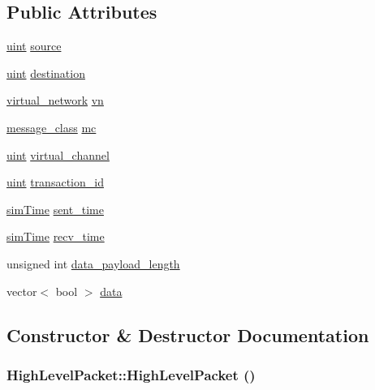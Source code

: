 \subsection*{Public Attributes}
\begin{CompactItemize}
\item 
\hyperlink{outputBuffer_8h_91ad9478d81a7aaf2593e8d9c3d06a14}{uint} \hyperlink{classHighLevelPacket_d09485039d19ea9f0f58697e9fdf6450}{source}
\item 
\hyperlink{outputBuffer_8h_91ad9478d81a7aaf2593e8d9c3d06a14}{uint} \hyperlink{classHighLevelPacket_abe7a75c784f1824211ba194819e0d4e}{destination}
\item 
\hyperlink{highLevelPacket_8h_2f11671ee174f5c324e71f348aef6e96}{virtual\_\-network} \hyperlink{classHighLevelPacket_0e554b43c609ab77758300f332679a29}{vn}
\item 
\hyperlink{highLevelPacket_8h_155eefa40b3e6db305cb151f7bb6bef4}{message\_\-class} \hyperlink{classHighLevelPacket_4bddc51ad584c87c2241b800f6b2f0c9}{mc}
\item 
\hyperlink{outputBuffer_8h_91ad9478d81a7aaf2593e8d9c3d06a14}{uint} \hyperlink{classHighLevelPacket_0e369f54800e9bb403f8277b94cbaa96}{virtual\_\-channel}
\item 
\hyperlink{outputBuffer_8h_91ad9478d81a7aaf2593e8d9c3d06a14}{uint} \hyperlink{classHighLevelPacket_287c21f9e31f882ffe8c8ff353dab087}{transaction\_\-id}
\item 
\hyperlink{genericComponentHeader_8h_d88faca783e7aa496cda721d9029a2e3}{simTime} \hyperlink{classHighLevelPacket_eed2f14fb0b689f35a92c054a831867c}{sent\_\-time}
\item 
\hyperlink{genericComponentHeader_8h_d88faca783e7aa496cda721d9029a2e3}{simTime} \hyperlink{classHighLevelPacket_5de1d4d144aa5e9fdac1a3988384d92f}{recv\_\-time}
\item 
unsigned int \hyperlink{classHighLevelPacket_c7bf05e9b1560991d60ca12fd0d309a3}{data\_\-payload\_\-length}
\item 
vector$<$ bool $>$ \hyperlink{classHighLevelPacket_340b7688df206e49a62301e2dae093de}{data}
\end{CompactItemize}


\subsection{Constructor \& Destructor Documentation}
\hypertarget{classHighLevelPacket_e6f7a4ec429537928d24f6a2199a3f8d}{
\subsubsection[{HighLevelPacket}]{\setlength{\rightskip}{0pt plus 5cm}HighLevelPacket::HighLevelPacket ()}}
\label{classHighLevelPacket_e6f7a4ec429537928d24f6a2199a3f8d}


